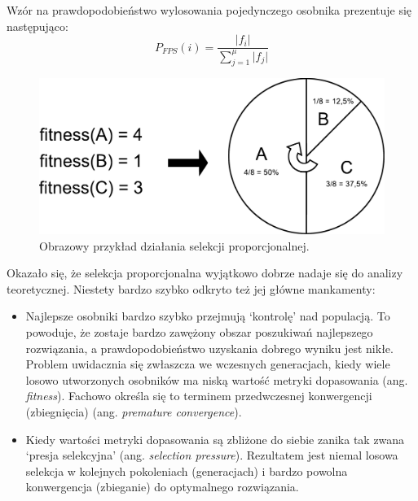 \documentclass[a4paper,12pt]{article}
\numberwithin{figure}{section}
\begin{document}
    \bigskip

    \noindent
    \begin{minipage}[H]{\textwidth}
        \setlength\parindent{17pt} Wzór na prawdopodobieństwo wylosowania pojedynczego osobnika prezentuje się następująco: \\
        \begin{equation}
            \label{eq:fitness_proportionate_selection}
            P_{FPS}(i) = \frac{\lvert f_{i} \rvert}{\sum_{j=1}^{\mu} \lvert f_{j} \rvert}
        \end{equation}
    \end{minipage}

    \bigskip

    \begin{figure}[H]
        \centering
        \includegraphics[width=\textwidth]{proportional_selection}
        \caption{Obrazowy przykład działania selekcji proporcjonalnej.}
        \label{fig:proportional_selection}
    \end{figure}

    \bigskip

    Okazało się, że selekcja proporcjonalna wyjątkowo dobrze nadaje się do analizy teoretycznej. Niestety bardzo szybko odkryto też jej główne mankamenty\cite{IntroductionToEvolutionaryComputing2015}:
    \begin{itemize}
        \item Najlepsze osobniki bardzo szybko przejmują `kontrolę' nad populacją. To powoduje, że zostaje bardzo zawężony obszar poszukiwań najlepszego rozwiązania, a prawdopodobieństwo uzyskania dobrego wyniku jest nikłe. Problem uwidacznia się zwłaszcza we wczesnych generacjach, kiedy wiele losowo utworzonych osobników ma niską wartość metryki dopasowania (ang. \textit{fitness}). Fachowo określa się to terminem przedwczesnej konwergencji (zbiegnięcia) (ang. \textit{premature convergence}).
        \item Kiedy wartości metryki dopasowania są zbliżone do siebie zanika tak zwana `presja selekcyjna' (ang. \textit{selection pressure}). Rezultatem jest niemal losowa selekcja w kolejnych pokoleniach (generacjach) i bardzo powolna konwergencja (zbieganie) do optymalnego rozwiązania.
    \end{itemize}
\end{document}
